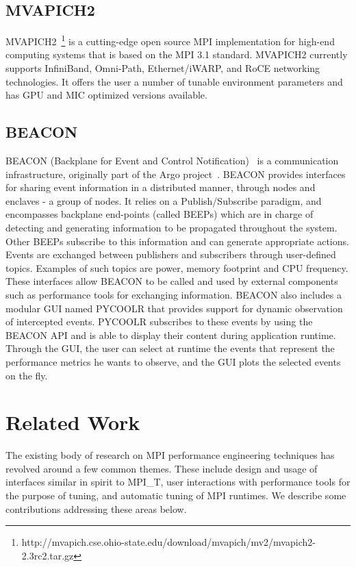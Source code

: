 \subsection{MVAPICH2}
MVAPICH2~\cite{MVAPICH2}\footnote{http://mvapich.cse.ohio-state.edu/download/mvapich/mv2/mvapich2-2.3rc2.tar.gz} is a cutting-edge open source MPI implementation for high-end computing systems that is based on the MPI 3.1 standard. MVAPICH2 currently supports InfiniBand, Omni-Path, Ethernet/iWARP, and RoCE networking technologies. It offers the user a number of tunable environment parameters and has GPU and MIC optimized versions available.

\subsection{BEACON}
BEACON (Backplane for Event and Control Notification)~\cite{BEACON} is a communication infrastructure, originally part of the Argo project~\cite{Perarnau:2015:DMM:2960986.2961000}.
BEACON provides interfaces for sharing event information in a distributed manner, through nodes and enclaves - a group of nodes.
It relies on a Publish/Subscribe paradigm, and encompasses backplane end-points (called BEEPs) which are in charge of detecting and generating information to be propagated throughout the system.
Other BEEPs subscribe to this information and can generate appropriate actions.  
Events are exchanged between publishers and subscribers through user-defined topics. Examples of such topics are power, memory footprint and CPU frequency.
These interfaces allow BEACON to be called and used by external components such as performance tools for exchanging information.
BEACON also includes a modular GUI named PYCOOLR that provides support for dynamic observation of intercepted events. PYCOOLR subscribes to these events by using the BEACON API and is able to display their content during application runtime. Through the GUI, the user can select at runtime the events that represent the performance metrics he wants to observe, and the GUI plots the selected events on the fly.


\section{Related Work}
The existing body of research on MPI performance engineering techniques has revolved around a few common themes. These include design and usage of interfaces similar in spirit to MPI\_T, user interactions with performance tools for the purpose of tuning, and automatic tuning of MPI runtimes. We describe some contributions addressing these areas below.

